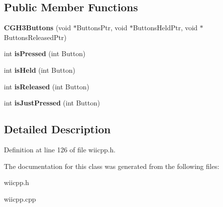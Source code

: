 \subsection*{\-Public \-Member \-Functions}
\begin{DoxyCompactItemize}
\item 
\hypertarget{class_c_g_h3_buttons_ac55bb0fb3a0f63e9ec9df0e013fac45c}{{\bfseries \-C\-G\-H3\-Buttons} (void $\ast$\-Buttons\-Ptr, void $\ast$\-Buttons\-Held\-Ptr, void $\ast$\-Buttons\-Released\-Ptr)}\label{class_c_g_h3_buttons_ac55bb0fb3a0f63e9ec9df0e013fac45c}

\item 
\hypertarget{class_c_button_base_a0d4758b9e756a8c3c2bb39b907ea9170}{int {\bfseries is\-Pressed} (int \-Button)}\label{class_c_button_base_a0d4758b9e756a8c3c2bb39b907ea9170}

\item 
\hypertarget{class_c_button_base_a67e38daead9d22e33f6a3d85902d1f98}{int {\bfseries is\-Held} (int \-Button)}\label{class_c_button_base_a67e38daead9d22e33f6a3d85902d1f98}

\item 
\hypertarget{class_c_button_base_a575dee487bcca1abf29c1084dfdd5bb8}{int {\bfseries is\-Released} (int \-Button)}\label{class_c_button_base_a575dee487bcca1abf29c1084dfdd5bb8}

\item 
\hypertarget{class_c_button_base_ab74fd21217c5e379a613b7474af4f9b8}{int {\bfseries is\-Just\-Pressed} (int \-Button)}\label{class_c_button_base_ab74fd21217c5e379a613b7474af4f9b8}

\end{DoxyCompactItemize}


\subsection{\-Detailed \-Description}


\-Definition at line 126 of file wiicpp.\-h.



\-The documentation for this class was generated from the following files\-:\begin{DoxyCompactItemize}
\item 
wiicpp.\-h\item 
wiicpp.\-cpp\end{DoxyCompactItemize}
